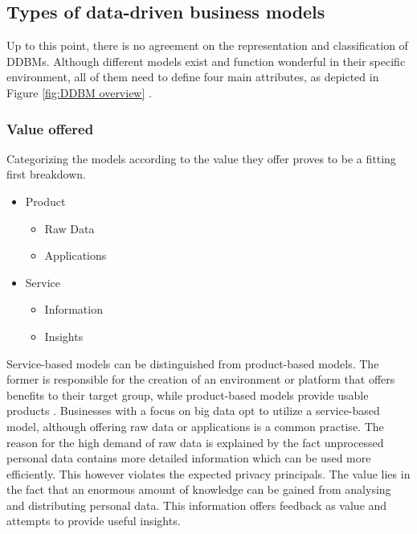 \subsection{Types of data-driven business models}


Up to this point, there is no agreement on the representation and classification of \gls{DDBM}s. 
Although different models exist and function wonderful in their specific environment, all of them need to define four main attributes, as depicted in Figure \ref{fig:DDBM overview} \cite{Hartmann2016}.

\subsubsection{Value offered}
\label{s:value offered}
Categorizing the models according to the value they offer proves to be a fitting first breakdown. 

\begin{itemize}
    \item Product
    \begin{itemize}
        \item Raw Data
        \item Applications
    \end{itemize}
    \item Service
    \begin{itemize}
        \item Information
        \item Insights
    \end{itemize}    
\end{itemize}

Service-based models can be distinguished from product-based models. 
The former is responsible for the creation of an environment or platform that offers benefits to their target group, while product-based models provide usable products \cite{Zolnowski, Visnjic2016}. 
Businesses with a focus on big data opt to utilize a service-based model, although offering raw data or applications is a common practise. 
The reason for the high demand of raw data is explained by the fact unprocessed personal data contains more detailed information which can be used more efficiently.
This however violates the expected privacy principals.
The value lies in the fact that an enormous amount of knowledge can be gained from analysing and distributing personal data. This information offers feedback as value and attempts to provide useful insights. 

